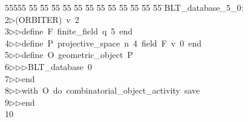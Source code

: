 %
%
\begin{tabbing}
55555 \= 55 \= 55 \= 55 \= 55 \= 55 \= 55 \= 55 \= 55 \= 55 \= 55 \= 55 \= 55 \= \>BLT\_database\_5\_0:\\[0pt]
2\>$\triangleright$\>(ORBITER)\ v\ 2\ \\[0pt]
3\>$\triangleright$\>$\triangleright$\>define\ F\ finite\_field\ q\ 5\ end\ \\[0pt]
4\>$\triangleright$\>$\triangleright$\>define\ P\ projective\_space\ n\ 4\ field\ F\ v\ 0\ end\ \\[0pt]
5\>$\triangleright$\>$\triangleright$\>define\ O\ geometric\_object\ P\ \\[0pt]
6\>$\triangleright$\>$\triangleright$\>$\triangleright$\>BLT\_database\ 0\ \\[0pt]
7\>$\triangleright$\>$\triangleright$\>end\ \\[0pt]
8\>$\triangleright$\>$\triangleright$\>with\ O\ do\ combinatorial\_object\_activity\ save\ \\[0pt]
9\>$\triangleright$\>$\triangleright$\>end\\[0pt]
10\>\end{tabbing}
